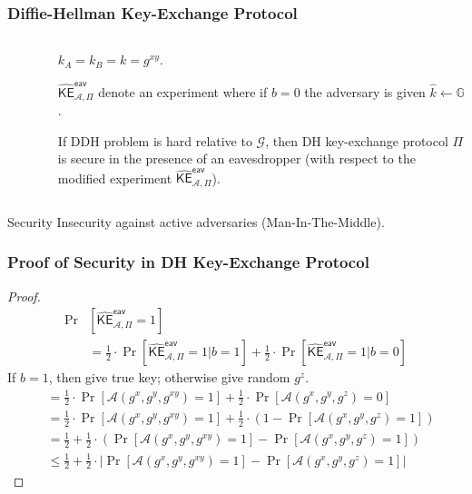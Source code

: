 \begin{frame}\frametitle{Diffie-Hellman Key-Exchange Protocol}
\begin{columns}[h]
\begin{column}{5cm}
\begin{figure}
\begin{center}

\end{center}
\end{figure}
\end{column}
\begin{column}{6cm}
$k_A = k_B = k = g^{xy}$.
\newline
	
$\widehat{\mathsf{KE}}^{\mathsf{eav}}_{\mathcal{A},\Pi}$ denote an experiment where if $b=0$ the adversary is given $\hat{k} \gets \mathbb{G}$.
\begin{theorem}
If DDH problem is hard relative to $\mathcal{G}$, then DH key-exchange protocol $\Pi$ is secure in the presence of an eavesdropper (with respect to the modified experiment $\widehat{\mathsf{KE}}^{\mathsf{eav}}_{\mathcal{A},\Pi}$). 
\end{theorem}
\end{column}
\end{columns}
\begin{alertblock}{Security}
Insecurity against active adversaries (Man-In-The-Middle).
\end{alertblock}
\end{frame}
\begin{frame}\frametitle{Proof of Security in DH Key-Exchange Protocol}
\begin{proof}
\begin{align*}
\Pr & \left[ \widehat{\mathsf{KE}}^{\mathsf{eav}}_{\mathcal{A},\Pi} =1\right] \\	
&= \frac{1}{2}\cdot \Pr\left[ \widehat{\mathsf{KE}}^{\mathsf{eav}}_{\mathcal{A},\Pi} =1 | b=1\right] + \frac{1}{2}\cdot \Pr\left[ \widehat{\mathsf{KE}}^{\mathsf{eav}}_{\mathcal{A},\Pi} =1 | b=0\right]
\end{align*}
If $b=1$, then give true key; otherwise give random $g^z$.
\begin{align*}
&= \frac{1}{2}\cdot \Pr\left[ \mathcal{A}(g^x,g^y,g^{xy})=1 \right] + \frac{1}{2}\cdot \Pr\left[ \mathcal{A}(g^x,g^y,g^z)=0 \right]\\
&= \frac{1}{2}\cdot \Pr\left[ \mathcal{A}(g^x,g^y,g^{xy})=1 \right] + \frac{1}{2}\cdot (1-\Pr\left[ \mathcal{A}(g^x,g^y,g^z)=1 \right])\\
&= \frac{1}{2} + \frac{1}{2}\cdot \left( \Pr\left[ \mathcal{A}(g^x,g^y,g^{xy})=1 \right] - \Pr\left[ \mathcal{A}(g^x,g^y,g^z)=1 \right] \right)\\
&\le \frac{1}{2} + \frac{1}{2}\cdot \left| \Pr\left[ \mathcal{A}(g^x,g^y,g^{xy})=1 \right] - \Pr\left[ \mathcal{A}(g^x,g^y,g^z)=1 \right] \right|
\end{align*}
\end{proof}
\end{frame}
